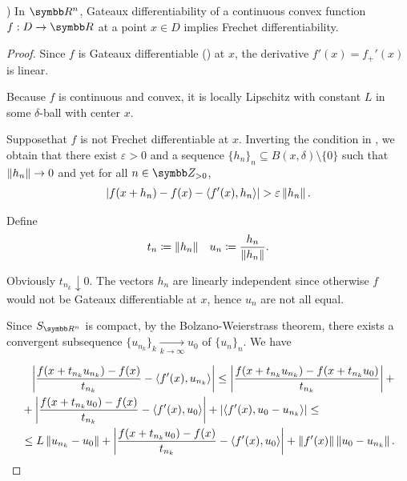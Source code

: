 \begin{theorem}\label{thm:rn_continuous_convex_gateaux_implies_frechet}\cite[exercise 1.15(a]{Phelps1993})
  In \( \BR^n \), Gateaux differentiability of a continuous convex function \( f: D \to \BR \) at a point \( x \in D \) implies Frechet differentiability.
\end{theorem}
\begin{proof}
  Since \( f \) is Gateaux differentiable () at \( x \), the derivative \( f'(x) = f_+'(x) \) is linear.

  Because \( f \) is continuous and convex, it is locally Lipschitz with constant \( L \) in some \( \delta \)-ball with center \( x \).

  Suppose\LEM that \( f \) is not Frechet differentiable at \( x \). Inverting the condition in , we obtain that there exist \( \varepsilon > 0 \) and a sequence \( \{ h_n \}_n \subseteq B(x, \delta) \setminus \{ 0 \} \) such that \( \left\Vert h_n \right\Vert \to 0 \) and yet for all \( n \in \BZ_{>0} \),
  \begin{align}\label{thm:rn_continuous_convex_gateaux_implies_frechet/frechet_assumption}
    \left\vert f(x + h_n) - f(x) - \left\langle f'(x), h_n \right\rangle \right\vert > \varepsilon \left\Vert h_n \right\Vert.
  \end{align}

  Define
  \begin{align*}
    t_n \coloneqq \left\Vert h_n \right\Vert
    &&
    u_n \coloneqq \frac{h_n} {\left\Vert h_n \right\Vert}.
  \end{align*}

  Obviously \( t_{n_k} \downarrow 0 \). The vectors \( h_n \) are linearly independent since otherwise \( f \) would not be Gateaux differentiable at \( x \), hence \( u_n \) are not all equal.

  Since \( S_{\BR^n} \) is compact\USC, by the Bolzano-Weierstrass theorem, there exists a convergent subsequence \( \{ u_{n_k} \}_k \underset {k \to \infty} \to u_0 \) of \( \{ u_n \}_n \). We have

  \begin{align}\label{thm:rn_continuous_convex_gateaux_implies_frechet/frechet_estimate}
    &\phantom= \Abs{\frac {f(x + t_{n_k} u_{n_k}) - f(x)} {t_{n_k}} - \Prod{f'(x)} {u_{n_k}}}
    \leq \nonumber
    \Abs{\frac {f(x + t_{n_k} u_{n_k}) - f(x + t_{n_k} u_0)} {t_{n_k}}} + \\ &+ \Abs{\frac {f(x + t_{n_k} u_0) - f(x)} {t_{n_k}} - \Prod{f'(x)} {u_0}} + \Abs{\Prod{f'(x)} {u_0 - u_{n_k}}}
    \leq \nonumber \\ &\leq
    L \Norm{u_{n_k} - u_0} + \Abs{\frac {f(x + t_{n_k} u_0) - f(x)} {t_{n_k}} - \Prod{f'(x)} {u_0}} + \Norm{f'(x)} \Norm{u_0 - u_{n_k}}.
  \end{align}


\end{proof}
